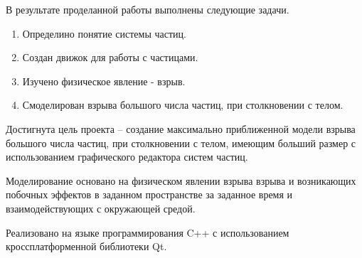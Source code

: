 \Conclusion %

\hfill

В результате проделанной работы выполнены следующие задачи. 
\begin{enumerate}
	\item Определино понятие системы частиц. 
	\item Создан движок для работы с частицами. 
	\item Изучено физическое явление - взрыв. 
	\item Смоделирован взрыва большого числа частиц, при столкновении с телом. 
\end{enumerate}

Достигнута цель проекта -- создание максимально приближенной модели взрыва большого числа частиц, при столкновении с телом, имеющим больший размер с использованием графического редактора систем частиц. 

Моделирование основано на физическом явлении взрыва взрыва и возникающих побочных эффектов в заданном пространстве за заданное время и взаимодействующих с окружающей средой. 

Реализовано на языке программирования C++ с использованием кроссплатформенной библиотеки Qt. 